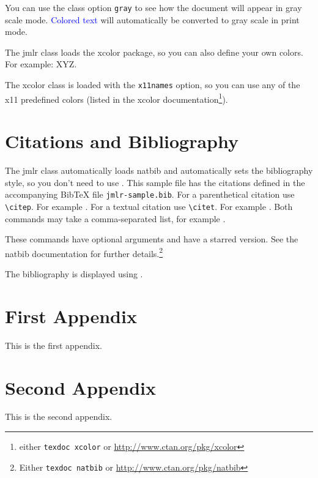 \documentclass[pmlr,twocolumn,10pt]{jmlr} %
\begin{document}
You can use the class option \texttt{gray} to see how the
document will appear in gray scale mode. \textcolor{blue}{Colored
text} will automatically be converted to gray scale in print mode.

The \textsf{jmlr} class loads the \textsf{xcolor}
package, so you can also define your own colors. For example:
\ifprint
  {}%
  {}%
\textcolor{myred}{XYZ}.

The \textsf{xcolor} class is loaded with the \texttt{x11names}
option, so you can use any of the x11 predefined colors (listed
in the \textsf{xcolor} documentation\footnote{either 
\texttt{texdoc xcolor} or \url{http://www.ctan.org/pkg/xcolor}}).

\section{Citations and Bibliography}
\label{sec:cite}

The \textsf{jmlr} class automatically loads \textsf{natbib}
and automatically sets the bibliography style, so you don't need to
use \verb||.
This sample file has the citations defined in the accompanying
BibTeX file \texttt{jmlr-sample.bib}. For a parenthetical
citation use \verb|\citep|. For example
\citep{guyon-elisseeff-03}. For a textual citation use
\verb|\citet|. For example \citet{guyon2007causalreport}. 
Both commands may take a comma-separated list, for example
\citet{guyon-elisseeff-03,guyon2007causalreport}.

These commands have optional arguments and have a starred
version. See the \textsf{natbib} documentation for further
details.\footnote{Either \texttt{texdoc natbib} or
\url{http://www.ctan.org/pkg/natbib}}

The bibliography is displayed using \verb||.




\appendix

\section{First Appendix}\label{apd:first}

This is the first appendix.

\section{Second Appendix}\label{apd:second}

This is the second appendix.
\end{document}
